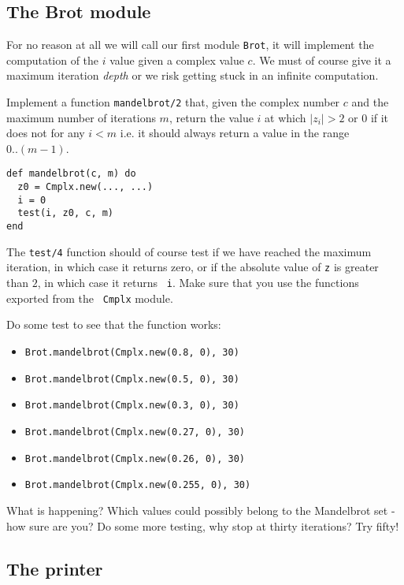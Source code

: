 \documentclass[a4paper,11pt]{article}
\begin{document}
\subsection{The Brot module}

For no reason at all we will call our first module {\tt Brot}, it will
implement the computation of the $i$ value given a complex value
$c$. We must of course give it a maximum iteration {\em depth} or we
risk getting stuck in an infinite computation.

Implement a function {\tt mandelbrot/2} that, given the complex number
$c$ and the maximum number of iterations $m$, return the value $i$ at
which $|z_i| > 2$ or $0$ if it does not for any $i < m$ i.e. it
should always return a value in the range $0..(m-1)$.

\begin{verbatim}
def mandelbrot(c, m) do
  z0 = Cmplx.new(..., ...)
  i = 0
  test(i, z0, c, m)
end
\end{verbatim}

The {\tt test/4} function should of course test if we have reached the
maximum iteration, in which case it returns zero, or if the absolute
value of {\tt z} is greater than $2$, in which case it returns {\tt
  i}. Make sure that you use the functions exported from the {\tt
  Cmplx} module.

Do some test to see that the function works:

\begin{itemize}
 \item {\tt Brot.mandelbrot(Cmplx.new(0.8, 0), 30)}
 \item {\tt Brot.mandelbrot(Cmplx.new(0.5, 0), 30)}
 \item {\tt Brot.mandelbrot(Cmplx.new(0.3, 0), 30)}
 \item {\tt Brot.mandelbrot(Cmplx.new(0.27, 0), 30)} 
 \item {\tt Brot.mandelbrot(Cmplx.new(0.26, 0), 30)}
 \item {\tt Brot.mandelbrot(Cmplx.new(0.255, 0), 30)}
\end{itemize}

What is happening? Which values could possibly belong to the
Mandelbrot set - how sure are you? Do some more testing, why stop at
thirty iterations? Try fifty!


\subsection{The printer}
\end{document}
